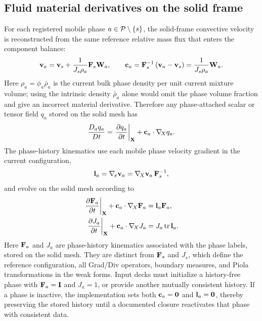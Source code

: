 \subsection{Fluid material derivatives on the solid frame}
\label{sec:fluid_material_derivatives_solid_frame}

For each registered mobile phase \(a\in\mathcal{P}\setminus\{s\}\), the
solid-frame convective velocity is reconstructed from the same reference
relative mass flux that enters the component balance:
\begin{equation}
	\mathbf{v}_a
	=
	\mathbf{v}_s+\frac{1}{J_s\rho_a}\mathbf{F}_s\mathbf{W}_a,
	\qquad
	\mathbf{c}_a
	=
	\mathbf{F}_s^{-1}\left(\mathbf{v}_a-\mathbf{v}_s\right)
	=
	\frac{1}{J_s\rho_a}\mathbf{W}_a .
	\label{eq:implementation_phase_velocity_reconstruction}
\end{equation}
Here \(\rho_a=\phi_a\bar\rho_a\) is the current bulk phase density per unit
current mixture volume; using the intrinsic density \(\bar\rho_a\) alone would
omit the phase volume fraction and give an incorrect material derivative.
Therefore any phase-attached scalar or tensor field \(q_a\) stored on the solid
mesh has
\begin{equation}
	\frac{D_a q_a}{Dt}
	=
	\left.\frac{\partial q_a}{\partial t}\right|_{\mathbf{X}}
	+\mathbf{c}_a\cdot\nabla_{\!X} q_a .
	\label{eq:fluid_material_derivative_on_solid_frame}
\end{equation}
The phase-history kinematics use each mobile phase velocity gradient in the
current configuration,
\begin{equation}
	\mathbf{l}_a
	=
	\nabla_{\!x} \mathbf{v}_a
	=
	\nabla_{\!X}\mathbf{v}_a\,\mathbf{F}_s^{-1},
	\label{eq:implementation_phase_velocity_gradient}
\end{equation}
and evolve on the solid mesh according to
\begin{subequations}
	\label{eq:implementation_phase_history_kinematics}
	\begin{align}
		\left.\frac{\partial \mathbf{F}_a}{\partial t}\right|_{\mathbf{X}}
		+\mathbf{c}_a\cdot\nabla_{\!X}\mathbf{F}_a
		 & =
		\mathbf{l}_a\mathbf{F}_a,
		\label{eq:implementation_phase_deformation_gradient_history} \\
		\left.\frac{\partial J_a}{\partial t}\right|_{\mathbf{X}}
		+\mathbf{c}_a\cdot\nabla_{\!X} J_a
		 & =
		J_a\operatorname{tr}\mathbf{l}_a .
		\label{eq:implementation_phase_jacobian_history}
	\end{align}
\end{subequations}
Here \(\mathbf{F}_a\) and \(J_a\) are phase-history kinematics associated with the
phase labels, stored on the solid mesh.  They are distinct from
\(\mathbf{F}_s\) and \(J_s\), which define the reference configuration, all
Grad/Div operators, boundary measures, and Piola transformations in the weak
forms.  Input decks must initialize a history-free phase with
\(\mathbf{F}_a=\mathbf{I}\) and \(J_a=1\), or provide another mutually consistent
history.  If a phase is inactive, the implementation sets both
\(\mathbf{c}_a=\mathbf{0}\) and \(\mathbf{l}_a=\mathbf{0}\), thereby preserving the stored
history until a documented closure reactivates that phase with consistent data.


